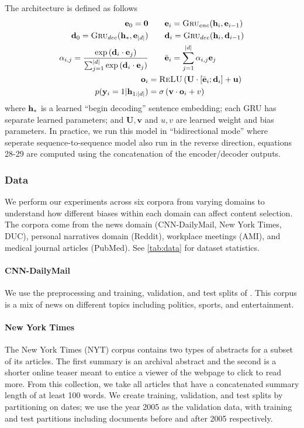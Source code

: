 The architecture is defined as follows
\begin{align}
    \mathbf{e}_0 = \textbf{0}& \quad \quad   \mathbf{e}_i = \textsc{Gru}_{enc}(\mathbf{h}_i, \mathbf{e}_{i-1}) \\
    \mathbf{d}_0 = \textsc{Gru}_{dec}(\mathbf{h}_*, \mathbf{e}_{| d |}) &\quad\quad
\mathbf{d}_i = \textsc{Gru}_{dec}(\mathbf{h}_{i}, \mathbf{d}_{i-1}) \label{eq:cl1} \\
 \alpha_{i,j} = 
   \frac{\exp \left(\mathbf{d}_i \cdot \mathbf{e}_j \right)}{
   \sum_{j=1}^{| d |}\exp\left(\mathbf{d}_i \cdot \mathbf{e}_j\right)}
& \quad\quad \bar{\mathbf{e}}_i = \sum_{j=1}^{| d |} \alpha_{i,j} \mathbf{e}_j \\
\mathbf{o}_i &= \textsc{ReLU}\left(\mathbf{U} \cdot [\bar{\mathbf{e}}_i; \mathbf{d}_i] + \mathbf{u} \right)\\
p(\mathbf{y}_i=1|\mathbf{h}_{1:| d |}) &= \sigma\left(\mathbf{v}\cdot \mathbf{o}_i + v  \right) 
\end{align}
where $\mathbf{h}_*$ is a learned ``begin decoding'' sentence embedding;
each GRU has separate learned 
parameters; and $\mathbf{U}, \mathbf{v}$ and $u, v$ are learned weight and 
bias parameters. In practice, we run this model in ``bidirectional mode'' 
where seperate sequence-to-sequence model also run in the reverse direction,
equations 28-29 are computed using the concatenation of the encoder/decoder
outputs. 

\subsubsection{Data}

We perform our experiments across six corpora from varying domains to 
understand how different biases within each domain can affect content 
selection. The corpora come from the news domain
(CNN-DailyMail, New York Times, DUC), personal narratives domain (Reddit),
workplace meetings (AMI), and medical journal articles (PubMed). See 
\autoref{tab:data} for dataset statistics.


\paragraph{CNN-DailyMail} We use the preprocessing and training, validation, 
and test splits
of \cite{see2017get}.
This corpus is a mix of news on different topics including politics,
sports, and entertainment.

\paragraph{New York Times}The New York Times (NYT) corpus \citep{sandhaus2008new} contains
 two types of abstracts for a subset of its articles. The first summary is
an archival abstract and the 
second is a shorter online teaser meant to entice a viewer of the webpage to
click to read more. From this collection, we take all articles that have 
a concatenated summary length of at least 100 words.
We create training, validation, and test splits by partitioning on dates;
we use the year 2005 as the validation data, with training and test partitions
including documents before and after 2005 respectively.

